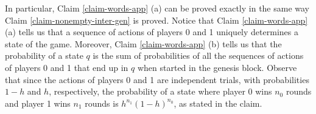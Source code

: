 In particular, Claim \ref{claim-words-app} (a) can be proved exactly in the same way Claim \ref{claim-nonempty-inter-gen} is proved. Notice that Claim \ref{claim-words-app} (a)
tells us that a sequence of actions of players 0 and 1 uniquely determines a state of the game. 
Moreover,  Claim \ref{claim-words-app} (b)
tells us that the probability of a state $q$ is the sum of probabilities of all the sequences of actions of players 0 and 1 that end up in $q$ when started in the genesis block. Observe that since the actions of players 0 and 1 are independent trials, with  probabilities $1-h$ and $h$, respectively, the probability of a state where player 0 wins $n_0$ rounds and player 1 wins $n_1$ rounds is $h^{n_1}(1-h)^{n_0}$, as stated in the claim.


